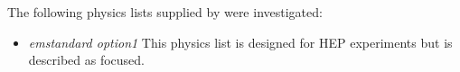 The following physics lists supplied by \geant were investigated:
\begin{itemize}
  \item \textit{emstandard option1}
    This physics list is designed for HEP experiments but is described as \cms focused.
\end{itemize}







